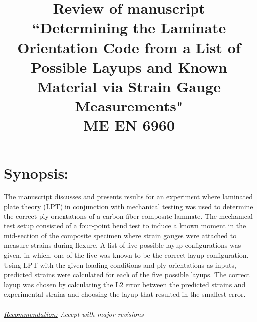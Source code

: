 \documentclass[12pt]{article}
\begin{document}
\title{ Review of manuscript ``Determining the Laminate Orientation Code from a List of Possible Layups and Known Material via Strain Gauge Measurements" \\ \normalsize{ME EN 6960}}
\maketitle


\section*{Synopsis:} 
The manuscript discusses and presents results for an experiment where laminated plate theory (LPT) in conjunction with mechanical testing was used to determine the correct ply orientations of a carbon-fiber composite laminate. The mechanical test setup consisted of a four-point bend test to induce a known moment in the mid-section of the composite specimen where strain gauges were attached to measure strains during flexure. A list of five possible layup configurations was given, in which, one of the five was known to be the correct layup configuration. Using LPT with the given loading conditions and ply orientations as inputs, predicted strains were calculated for each of the five possible layups. The correct layup was chosen by calculating the L2 error between the predicted strains and experimental strains and choosing the layup that resulted in the smallest error.
\\ 
\\
\textit{\underline{Recommendation:} Accept with major revisions}
\end{document}
